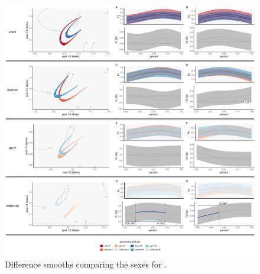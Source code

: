 \begin{figure}[p]
    \centering
    \includegraphics[width=\textwidth]{Figures/BIN/BIN_sex_panel_plot.pdf}
    \caption{Difference smooths comparing the sexes for \bin.}
    \label{fig:bin_diff_smooths_sex_gen}
\end{figure}




